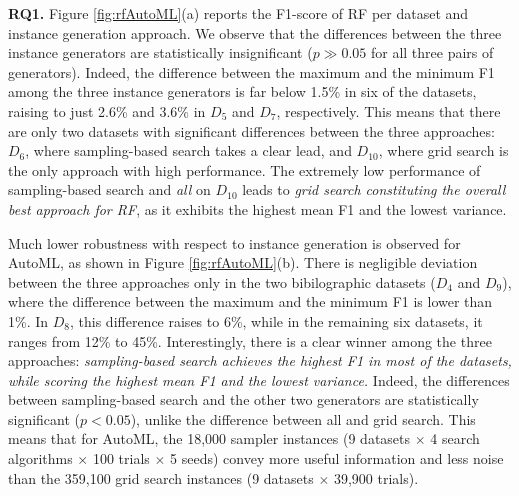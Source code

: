 \textbf{RQ1.} Figure \ref{fig:rfAutoML}(a) reports the F1-score of RF per dataset and instance generation approach. We observe that {the differences between the three instance generators are statistically insignificant ($p\gg0.05$ for all three pairs of generators)}. Indeed, the difference between the maximum and the minimum F1 among the three instance generators is far below 1.5\% in six of the datasets, raising to just 2.6\% and 3.6\% in $D_5$ and $D_7$, respectively. This means that there are only two datasets with significant differences between the three approaches: $D_6$, where sampling-based search takes a clear lead, and $D_{10}$, where grid search is the only approach with high performance. The extremely low performance of sampling-based search and \textit{all} on $D_{10}$ leads to \textit{grid search constituting the overall best approach for RF}, as it exhibits the highest mean F1 and the lowest variance.

Much lower robustness with respect to instance generation is observed for AutoML, as shown in Figure \ref{fig:rfAutoML}(b). There is negligible deviation between the three approaches only in the two bibilographic datasets ($D_4$ and $D_9$), where the difference between the maximum and the minimum F1 is lower than 1\%. In $D_8$, this difference raises to 6\%, while in the remaining six datasets, it ranges from 12\% to 45\%. Interestingly, there is a clear winner among the three approaches: \textit{sampling-based search achieves the highest F1 in most of the datasets, while scoring the highest mean F1 and the lowest variance.} 
{Indeed, the differences between sampling-based search and the other two generators are statistically significant ($p<0.05$), unlike the difference between all and grid search.}
This means that for AutoML, the 18,000 sampler instances (9 datasets $\times$ 4 search algorithms $\times$ 100 trials $\times$ 5 seeds) convey more useful information and less noise than the 359,100 grid search instances (9 datasets $\times$ 39,900 trials). 

